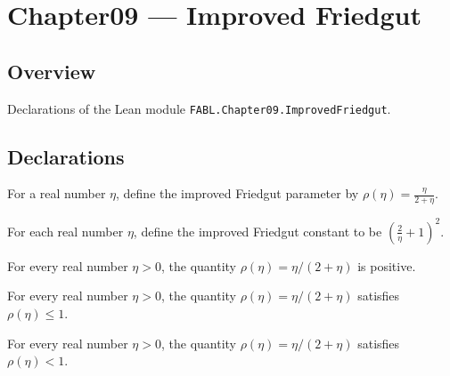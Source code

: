 \chapter{Chapter09 — Improved Friedgut}
\section{Overview}

Declarations of the Lean module \texttt{FABL.Chapter09.ImprovedFriedgut}.

\section{Declarations}

\begin{definition}
\label{FABL.improvedFriedgutRho}
\leanok
For a real number $\eta$, define the improved Friedgut parameter by
$\rho(\eta)=\frac{\eta}{2+\eta}$.
\end{definition}

\begin{definition}
\label{FABL.improvedFriedgutConstant}
\leanok
For each real number $\eta$, define the improved Friedgut constant to be
$\left(\frac{2}{\eta}+1\right)^2$.
\end{definition}

\begin{theorem}
\label{FABL.improvedFriedgutRho_pos}
\leanok
{}
For every real number $\eta>0$, the quantity $\rho(\eta)=\eta/(2+\eta)$ is positive.
\end{theorem}

\begin{theorem}
\label{FABL.improvedFriedgutRho_le_one}
\leanok
{}
For every real number $\eta>0$, the quantity $\rho(\eta)=\eta/(2+\eta)$ satisfies
$\rho(\eta)\le 1$.
\end{theorem}

\begin{theorem}
\label{FABL.improvedFriedgutRho_lt_one}
\leanok
{}
For every real number $\eta>0$, the quantity $\rho(\eta)=\eta/(2+\eta)$ satisfies
$\rho(\eta)<1$.
\end{theorem}

